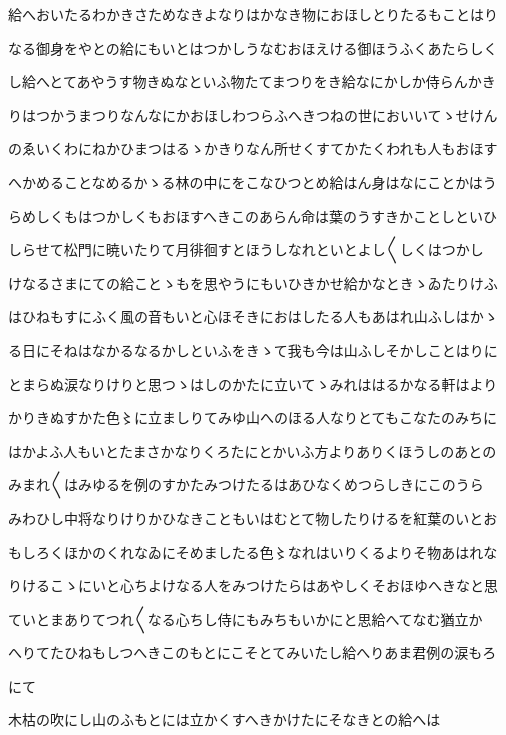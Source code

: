 \documentclass[a4paper,11pt,landscape]{ltjtarticle}
\begin{document}
給へおいたるわかきさためなきよなりはかなき物におほしとりたるもことはり
\par\medskip
なる御身をやとの給にもいとはつかしうなむおほえける御ほうふくあたらしく
\par\medskip
し給へとてあやうす物きぬなといふ物たてまつりをき給なにかしか侍らんかき
\par\medskip
りはつかうまつりなんなにかおほしわつらふへきつねの世においいてゝせけん
\par\medskip
のゑいくわにねかひまつはるゝかきりなん所せくすてかたくわれも人もおほす
\par\medskip
へかめることなめるかゝる林の中にをこなひつとめ給はん身はなにことかはう
\par\medskip
らめしくもはつかしくもおほすへきこのあらん命は葉のうすきかことしといひ
\par\medskip
しらせて松門に暁いたりて月徘徊すとほうしなれといとよし〱しくはつかし
\par\medskip
けなるさまにての給ことゝもを思やうにもいひきかせ給かなときゝゐたりけふ
\par\medskip
はひねもすにふく風の音もいと心ほそきにおはしたる人もあはれ山ふしはかゝ
\par\medskip
る日にそねはなかるなるかしといふをきゝて我も今は山ふしそかしことはりに
\par\medskip
とまらぬ涙なりけりと思つゝはしのかたに立いてゝみれははるかなる軒はより
\par\medskip
かりきぬすかた色〻に立ましりてみゆ山へのほる人なりとてもこなたのみちに
\par\medskip
はかよふ人もいとたまさかなりくろたにとかいふ方よりありくほうしのあとの
\par\medskip
みまれ〱はみゆるを例のすかたみつけたるはあひなくめつらしきにこのうら
\par\medskip
みわひし中将なりけりかひなきこともいはむとて物したりけるを紅葉のいとお
\par\medskip
もしろくほかのくれなゐにそめましたる色〻なれはいりくるよりそ物あはれな
\par\medskip
りけるこゝにいと心ちよけなる人をみつけたらはあやしくそおほゆへきなと思
\par\medskip
ていとまありてつれ〱なる心ちし侍にもみちもいかにと思給へてなむ猶立か
\par\medskip
へりてたひねもしつへきこのもとにこそとてみいたし給へりあま君例の涙もろ
\par\medskip
にて
\par\medskip
木枯の吹にし山のふもとには立かくすへきかけたにそなきとの給へは
\par\medskip
\end{document}
